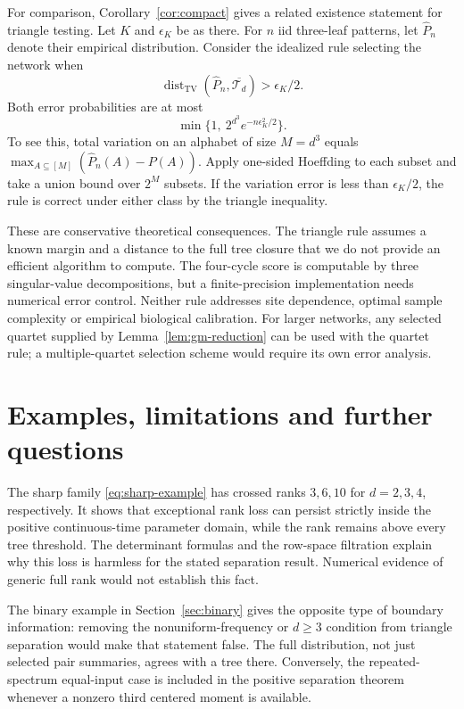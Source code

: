 \documentclass[11pt]{article}
\theoremstyle{definition}
\theoremstyle{remark}
\DeclareMathOperator{\dist}{dist}
\DeclareMathOperator{\TV}{TV}
\begin{document}
For comparison, Corollary~\ref{cor:compact} gives a related existence
statement for triangle testing. Let $K$ and $\epsilon_K$ be as there.
For $n$ iid three-leaf patterns, let $\widehat P_n$ denote their empirical
distribution. Consider the idealized rule selecting the network when
\[
 \dist_{\TV}(\widehat P_n,\overline{\mathcal T_d})>\epsilon_K/2.
\]
Both error probabilities are at most
\begin{equation}\label{eq:triangle-test}
 \min\{1,\ 2^{d^3}e^{-n\epsilon_K^2/2}\}.
\end{equation}
To see this, total variation on an alphabet of size $M=d^3$ equals
$\max_{A\subseteq[M]}(\widehat P_n(A)-P(A))$. Apply one-sided
Hoeffding to each subset and take a union bound over $2^M$ subsets.
If the variation error is less than $\epsilon_K/2$, the rule is correct
under either class by the triangle inequality.

These are conservative theoretical consequences. The triangle rule assumes
a known margin and a distance to the full tree closure that we do not
provide an efficient algorithm to compute. The four-cycle score is
computable by three singular-value decompositions, but a finite-precision
implementation needs numerical error control. Neither rule addresses site
dependence, optimal sample complexity or empirical biological calibration.
For larger networks, any selected quartet supplied by
Lemma~\ref{lem:gm-reduction} can be used with the quartet rule; a
multiple-quartet selection scheme would require its own error analysis.

\section{Examples, limitations and further questions}\label{sec:discussion}

The sharp family \eqref{eq:sharp-example} has crossed ranks $3,6,10$ for
$d=2,3,4$, respectively. It shows that exceptional rank loss can persist
strictly inside the positive continuous-time parameter domain, while the
rank remains above every tree threshold. The determinant formulas and the
row-space filtration explain why this loss is harmless for the stated
separation result. Numerical evidence of generic full rank would not
establish this fact.

The binary example in Section~\ref{sec:binary} gives the opposite type of
boundary information: removing the nonuniform-frequency or $d\ge3$
condition from triangle separation would make that statement false.
The full distribution, not just selected pair summaries, agrees with a
tree there. Conversely, the repeated-spectrum equal-input case is included
in the positive separation theorem whenever a nonzero third centered
moment is available.
\end{document}
